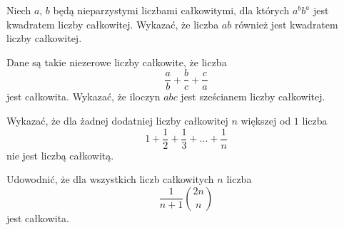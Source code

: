 






Niech $a$, $b$ będą nieparzystymi liczbami całkowitymi, dla których $a^bb^a$ jest kwadratem liczby całkowitej. Wykazać, że liczba $ab$ również jest kwadratem liczby całkowitej.




Dane są takie niezerowe liczby całkowite, że liczba
\[
	\frac{a}{b} + \frac{b}{c} + \frac{c}{a}
\]
jest całkowita. Wykazać, że iloczyn $abc$ jest sześcianem liczby całkowitej.




Wykazać, że dla żadnej dodatniej liczby całkowitej $n$ większej od $1$ liczba
\[
	1 + \frac{1}{2} + \frac{1}{3} + ... + \frac{1}{n}
\]
nie jest liczbą całkowitą.




Udowodnić, że dla wszystkich liczb całkowitych $n$ liczba 
\[
	\frac{1}{n+1}{{2n}\choose{n}}
\]
jest całkowita.


